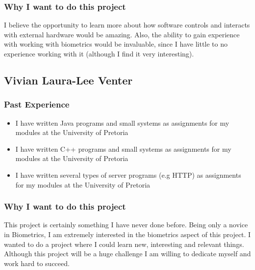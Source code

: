 \subsubsection{Why I want to do this project}
I believe the opportunity to learn more about how software controls and interacts with external hardware would be amazing. Also, the ability to gain experience with working with biometrics would be invaluable, since I have little to no experience working with it (although I find it very interesting). 


\pagebreak
\subsection{Vivian Laura-Lee Venter}

\subsubsection{Past Experience} 
\begin{itemize}
	\item{I have written Java programs and small systems as assignments for my modules at the University of Pretoria}
	\item{I have written C++ programs and small systems as assignments for my modules at the University of Pretoria}
	\item{I have written several types of server programs (e.g HTTP) as assignments for my modules at the University of Pretoria}
\end{itemize}
\subsubsection{Why I want to do this project}
This project is certainly something I have never done before. Being only a novice in Biometrics, I am extremely interested in the biometrics aspect of this project. I wanted to do a project where I could learn new, interesting and relevant things. Although this project will be a huge challenge I am willing to dedicate myself and work hard to succeed. 

